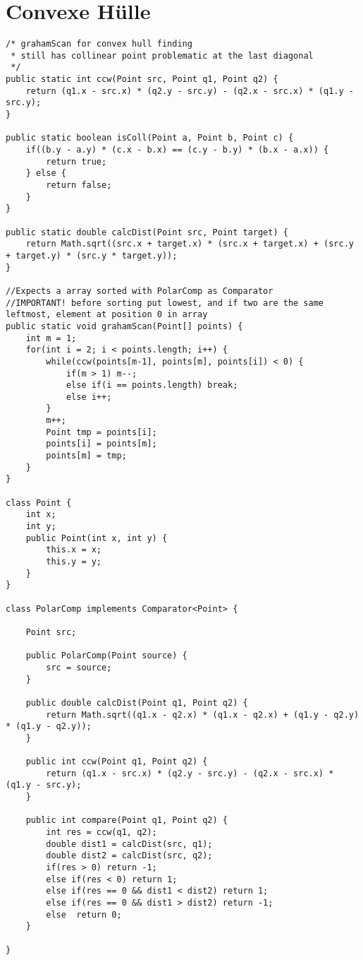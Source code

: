 \documentclass[10pt,a4paper]{article}
\begin{document}
\section{Convexe Hülle}
\begin{lstlisting}
/* grahamScan for convex hull finding
 * still has collinear point problematic at the last diagonal
 */
public static int ccw(Point src, Point q1, Point q2) {
    return (q1.x - src.x) * (q2.y - src.y) - (q2.x - src.x) * (q1.y - src.y);
}

public static boolean isColl(Point a, Point b, Point c) {
    if((b.y - a.y) * (c.x - b.x) == (c.y - b.y) * (b.x - a.x)) {
        return true;
    } else {
        return false;
    }
}
  
public static double calcDist(Point src, Point target) {
    return Math.sqrt((src.x + target.x) * (src.x + target.x) + (src.y + target.y) * (src.y * target.y));
}
   
//Expects a array sorted with PolarComp as Comparator
//IMPORTANT! before sorting put lowest, and if two are the same leftmost, element at position 0 in array
public static void grahamScan(Point[] points) {
    int m = 1;
    for(int i = 2; i < points.length; i++) {
        while(ccw(points[m-1], points[m], points[i]) < 0) {
            if(m > 1) m--;
            else if(i == points.length) break;
            else i++;
        }
        m++;
        Point tmp = points[i];
        points[i] = points[m];
        points[m] = tmp;
    }
}

class Point {
    int x;
    int y;
    public Point(int x, int y) {
        this.x = x;
        this.y = y;
    }
}

class PolarComp implements Comparator<Point> {

    Point src;
    
    public PolarComp(Point source) {
        src = source;
    }
    
    public double calcDist(Point q1, Point q2) {
        return Math.sqrt((q1.x - q2.x) * (q1.x - q2.x) + (q1.y - q2.y) * (q1.y - q2.y));
    }
    
    public int ccw(Point q1, Point q2) {
        return (q1.x - src.x) * (q2.y - src.y) - (q2.x - src.x) * (q1.y - src.y);
    }
    
    public int compare(Point q1, Point q2) {
        int res = ccw(q1, q2);
        double dist1 = calcDist(src, q1);
        double dist2 = calcDist(src, q2);
        if(res > 0) return -1;
        else if(res < 0) return 1;
        else if(res == 0 && dist1 < dist2) return 1;
        else if(res == 0 && dist1 > dist2) return -1;
        else  return 0;
    }
    
}
\end{lstlisting}
\newpage
\end{document}
